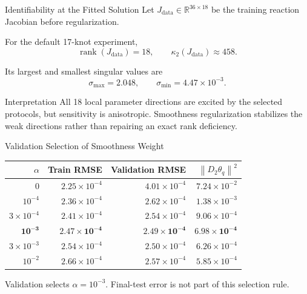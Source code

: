 \documentclass[aspectratio=169,10pt]{beamer}
\newcommand{\norm}[1]{\left\lVert #1\right\rVert}
\begin{document}
\begin{frame}{Identifiability at the Fitted Solution}
  \small
  Let $J_{\mathrm{data}}\in\mathbb R^{36\times18}$ be the training reaction
  Jacobian before regularization.

  For the default 17-knot experiment,
  \[
    \operatorname{rank}(J_{\mathrm{data}})=18,
    \qquad
    \kappa_2(J_{\mathrm{data}})\approx458.
  \]

  Its largest and smallest singular values are
  \[
    \sigma_{\max}=2.048,
    \qquad
    \sigma_{\min}=4.47\times10^{-3}.
  \]

  \begin{block}{Interpretation}
    All 18 local parameter directions are excited by the selected protocols,
    but sensitivity is anisotropic. Smoothness regularization stabilizes the
    weak directions rather than repairing an exact rank deficiency.
  \end{block}
\end{frame}

\begin{frame}{Validation Selection of Smoothness Weight}
  \small
  \begin{table}
    \centering
    \begin{tabular}{rrrr}
      \toprule
      $\alpha$ & Train RMSE & Validation RMSE &
      $\norm{D_2\theta_q}^2$ \\
      \midrule
      $0$ & $2.25{\times}10^{-4}$ & $4.01{\times}10^{-4}$ &
      $7.24{\times}10^{-2}$ \\
      $10^{-4}$ & $2.36{\times}10^{-4}$ & $2.62{\times}10^{-4}$ &
      $1.38{\times}10^{-3}$ \\
      $3{\times}10^{-4}$ & $2.41{\times}10^{-4}$ &
      $2.54{\times}10^{-4}$ & $9.06{\times}10^{-4}$ \\
      $\mathbf{10^{-3}}$ &
      $\mathbf{2.47{\times}10^{-4}}$ &
      $\mathbf{2.49{\times}10^{-4}}$ &
      $\mathbf{6.98{\times}10^{-4}}$ \\
      $3{\times}10^{-3}$ & $2.54{\times}10^{-4}$ &
      $2.50{\times}10^{-4}$ & $6.26{\times}10^{-4}$ \\
      $10^{-2}$ & $2.66{\times}10^{-4}$ & $2.57{\times}10^{-4}$ &
      $5.85{\times}10^{-4}$ \\
      \bottomrule
    \end{tabular}
  \end{table}

  Validation selects $\alpha=10^{-3}$. Final-test error is not part of this
  selection rule.
\end{frame}
\end{document}
